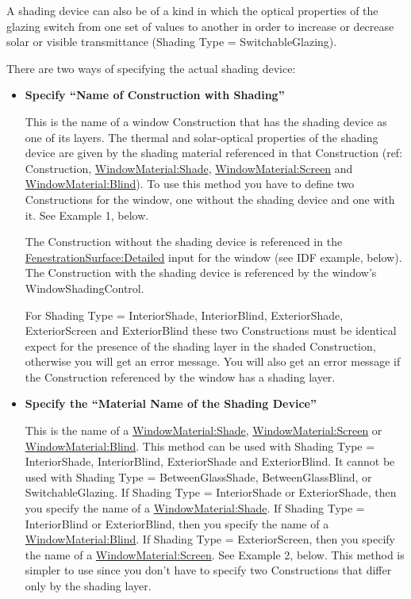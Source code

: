 A shading device can also be of a kind in which the optical properties of the glazing switch from one set of values to another in order to increase or decrease solar or visible transmittance (Shading Type = SwitchableGlazing).

There are two ways of specifying the actual shading device:

\begin{itemize}
  \item
\textbf{Specify ``Name of Construction with Shading''}

This is the name of a window Construction that has the shading device as one of its layers. The thermal and solar-optical properties of the shading device are given by the shading material referenced in that Construction (ref: Construction, \hyperref[windowmaterialshade]{WindowMaterial:Shade}, \hyperref[windowmaterialscreen]{WindowMaterial:Screen} and \hyperref[windowmaterialblind]{WindowMaterial:Blind}). To use this method you have to define two Constructions for the window, one without the shading device and one with it. See Example 1, below.

The Construction without the shading device is referenced in the \hyperref[fenestrationsurfacedetailed]{FenestrationSurface:Detailed} input for the window (see IDF example, below). The Construction with the shading device is referenced by the window's WindowShadingControl.

For Shading Type = InteriorShade, InteriorBlind, ExteriorShade, ExteriorScreen and ExteriorBlind these two Constructions must be identical expect for the presence of the shading layer in the shaded Construction, otherwise you will get an error message. You will also get an error message if the Construction referenced by the window has a shading layer.

  \item
\textbf{Specify the ``Material Name of the Shading Device''}

This is the name of a \hyperref[windowmaterialshade]{WindowMaterial:Shade}, \hyperref[windowmaterialscreen]{WindowMaterial:Screen} or \hyperref[windowmaterialblind]{WindowMaterial:Blind}. This method can be used with Shading Type = InteriorShade, InteriorBlind, ExteriorShade and ExteriorBlind. It cannot be used with Shading Type = BetweenGlassShade, BetweenGlassBlind, or SwitchableGlazing. If Shading Type = InteriorShade or ExteriorShade, then you specify the name of a \hyperref[windowmaterialshade]{WindowMaterial:Shade}. If Shading Type = InteriorBlind or ExteriorBlind, then you specify the name of a \hyperref[windowmaterialblind]{WindowMaterial:Blind}. If Shading Type = ExteriorScreen, then you specify the name of a \hyperref[windowmaterialscreen]{WindowMaterial:Screen}. See Example 2, below. This method is simpler to use since you don't have to specify two Constructions that differ only by the shading layer.


\end{itemize}
